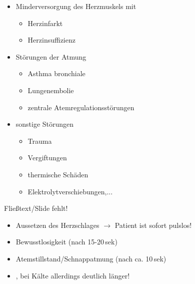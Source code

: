 {
\begin{itemize}
  \item Minderversorgung des Herzmuskels mit 
  \begin{itemize}
    \item Herzinfarkt
    \item Herzinsuffizienz
  \end{itemize}
  \item Störungen der Atmung
  \begin{itemize}
    \item Asthma bronchiale
    \item Lungenembolie
    \item zentrale Atemregulationsstörungen
  \end{itemize}
  \item sonstige Störungen
  \begin{itemize}
    \item Trauma
    \item Vergiftungen
    \item thermische Schäden
    \item Elektrolytverschiebungen,...
  \end{itemize}
\end{itemize}
}{}{}{}{}

{
   {Fließtext/Slide fehlt!}
\begin{itemize}
  \item Aussetzen des Herzschlages $\rightarrow$ Patient ist
  sofort pulslos!
  \item Bewusstlosigkeit (nach 15-20\,sek)
  \item Atemstillstand/Schnappatmung (nach ca. 10\,sek)
  \item {}, bei
  Kälte allerdings deutlich länger!
\end{itemize}
}{}{}{}{}










